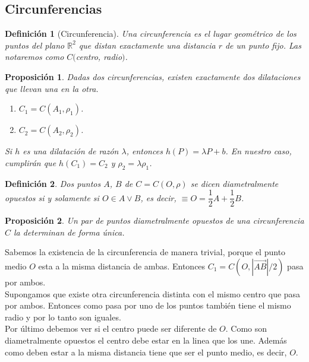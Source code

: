 \documentclass[11pt, a4paper]{article}
\makeatletter
\newif\IfInSansMode
\let\oldsf\sffamily
\renewcommand*{\sffamily}{\oldsf\mathversion{sans}\InSansModetrue}
\let\oldnorm\normalfont
\renewcommand*{\normalfont}{\oldnorm\InSansModefalse\mathversion{normal}}
\renewenvironment{proof}[1][\proofname] {\vspace{-15pt}\par\pushQED{\qed}\normalfont\topsep6\p@\@plus6\p@\relax\trivlist\item[\hskip\labelsep\it#1\@addpunct{.}]\ignorespaces}{\popQED\endtrivlist\@endpefalse}
\newcommand{\R}{\mathbb{R}}
\renewcommand{\vec}{\overrightarrow}
\renewenvironment{proof}[1][\proofname] {\par\pushQED{\qed}\normalfont\topsep6\p@\@plus6\p@\relax\trivlist\item[\hskip\labelsep\itshape\sffamily#1\@addpunct{.}]\ignorespaces}{\popQED\endtrivlist\@endpefalse}
\theoremstyle{theorem-style}
\newtheorem{nprop}{Proposición}[section]
\theoremstyle{definition-style}
\newtheorem{ndef}{Definición}[section]
\theoremstyle{remark-style}
\theoremstyle{example-style}
\makeatother
\begin{document}
\subsection{Circunferencias}

\begin{ndef}[Circunferencia]
  Una circunferencia es el lugar geométrico de los puntos del plano $\R^2$ que distan exactamente una distancia $r$ de un punto fijo. Las notaremos como $C($centro, radio$)$.
\end{ndef}

\begin{nprop}
  Dadas dos circunferencias, existen exactamente dos dilataciones que llevan una en la otra.
  \begin{enumerate}
  \item $C_1 = C(A_1,\rho_1)$.
  \item $C_2 = C(A_2,\rho_2)$.
  \end{enumerate}
  Si $h$ es una dilatación de razón $\lambda$, entonces $h(P) = \lambda P + b$.
  En nuestro caso, cumplirán que $h(C_1) = C_2$ y $\rho_2 = \lambda \rho_1$.
\end{nprop}

\begin{ndef}
  Dos puntos $A$, $B$ de $C = C(O,\rho) $ se dicen diametralmente opuestos si y solamente si $O \in A \vee B$, es decir, $\equiv O = \dfrac{1}{2}A + \dfrac{1}{2}B$.
\end{ndef}


\begin{nprop}
  Un par de puntos diametralmente opuestos de una circunferencia $C$ la determinan de forma única.
\end{nprop}
\begin{proof}
	Sabemos la existencia de la circunferencia de manera trivial, porque el punto medio $O$ esta a la misma distancia de ambas. Entonces $C_1 = C(O, |\vec{AB}|/2)$ pasa por ambos. \\
	Supongamos que existe otra circunferencia  distinta con el mismo centro que pasa por ambos. Entonces como pasa por uno de los puntos también tiene el mismo radio y por lo tanto son iguales.\\
	Por último debemos ver si el centro puede ser diferente de $O$. Como son diametralmente opuestos el centro debe estar en la linea que los une. Además como deben estar a la misma distancia tiene que ser el punto medio, es decir, $O$.
\end{proof}
\end{document}
